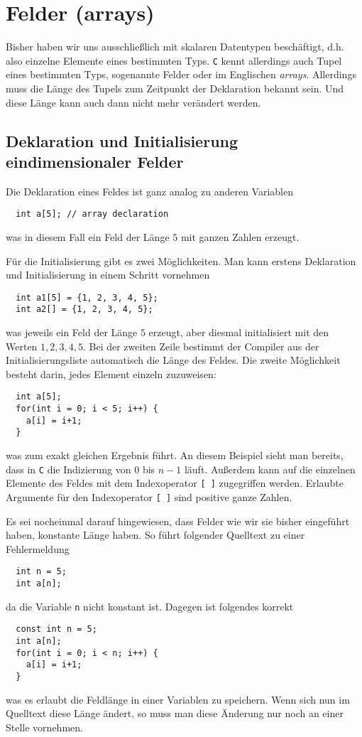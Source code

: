 \section{Felder (arrays)}

Bisher haben wir uns ausschließlich mit skalaren Datentypen beschäftigt, d.h. also einzelne Elemente eines bestimmten Typs.
\texttt{C} kennt allerdings auch Tupel eines bestimmten Typs, sogenannte Felder oder im Englischen \emph{arrays}.
Allerdings muss die Länge des Tupels zum Zeitpunkt der Deklaration bekannt sein.
Und diese Länge kann auch dann nicht mehr verändert werden.

\subsection{Deklaration und Initialisierung eindimensionaler Felder}

Die Deklaration eines Feldes ist ganz analog zu anderen Variablen
\begin{lstlisting}
  int a[5]; // array declaration
\end{lstlisting}
was in diesem Fall ein Feld der Länge $5$ mit ganzen Zahlen erzeugt.

Für die Initialisierung gibt es zwei Möglichkeiten.
Man kann erstens Deklaration und Initialisierung in einem Schritt vornehmen
\begin{lstlisting}
  int a1[5] = {1, 2, 3, 4, 5};
  int a2[] = {1, 2, 3, 4, 5};
\end{lstlisting}
was jeweils ein Feld der Länge $5$ erzeugt, aber diesmal initialisiert mit den Werten $1,2,3,4,5$.
Bei der zweiten Zeile bestimmt der Compiler aus der Initialisierungsliste automatisch die Länge des Feldes.
Die zweite Möglichkeit besteht darin, jedes Element einzeln zuzuweisen:
\begin{lstlisting}
  int a[5];
  for(int i = 0; i < 5; i++) {
    a[i] = i+1;
  }
\end{lstlisting}
was zum exakt gleichen Ergebnis führt.
An diesem Beispiel sieht man bereits, dass in \texttt{C} die Indizierung von $0$ bis $n-1$ läuft.
Außerdem kann auf die einzelnen Elemente des Feldes mit dem Indexoperator \verb|[ ]| zugegriffen werden.
Erlaubte Argumente für den Indexoperator \verb|[ ]| sind positive ganze Zahlen.\index{\texttt{[ ]}}

Es sei nocheinmal darauf hingewiesen, dass Felder wie wir sie bisher eingeführt haben, konstante Länge haben.
So führt folgender Quelltext zu einer Fehlermeldung
\begin{lstlisting}
  int n = 5;
  int a[n];
\end{lstlisting}
da die Variable \texttt{n} nicht konstant ist.
Dagegen ist folgendes korrekt
\begin{lstlisting}
  const int n = 5;
  int a[n];
  for(int i = 0; i < n; i++) {
    a[i] = i+1;
  }
\end{lstlisting}
was es erlaubt die Feldlänge in einer Variablen zu speichern.
Wenn sich nun im Quelltext diese Länge ändert, so muss man diese Änderung nur noch an einer Stelle vornehmen.

